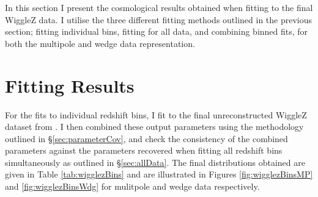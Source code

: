 \documentclass[titlesmallcaps, examinerscopy, copyrightpage]{uqthesis}
\begin{document}
In this section I present the cosmological results obtained when fitting to the final WiggleZ data. I utilise the three different fitting methods outlined in the previous section; fitting individual bins, fitting for all data, and combining binned fits, for both the multipole and wedge data representation.\\


\section{Fitting Results}

For the fits to individual redshift bins, I fit to the final unreconstructed WiggleZ dataset from \citet{KazinKoda2014}. I then combined these output parameters using the methodology outlined in \S\ref{sec:parameterCov}, and check the consistency of the combined parameters against the parameters recovered when fitting all redshift bins simultaneously as outlined in \S\ref{sec:allData}. The final distributions obtained are given in Table \ref{tab:wigglezBins} and are illustrated in Figures \ref{fig:wigglezBinsMP} and \ref{fig:wigglezBinsWdg} for mulitpole and wedge data respectively.\\
\end{document}
